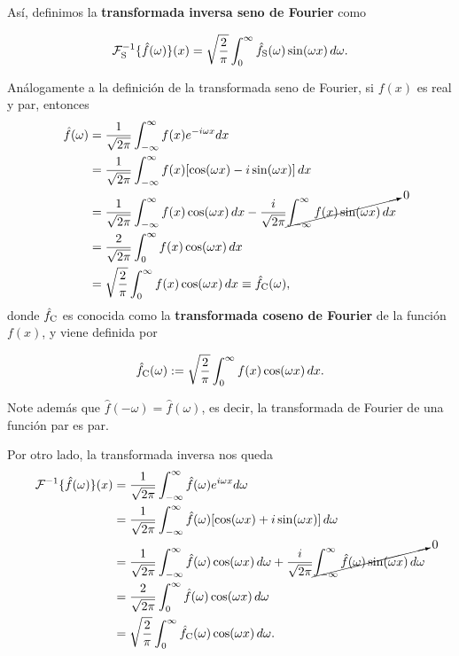 Así, definimos la \textbf{transformada inversa seno de Fourier} como
\begin{shaded}
    \begin{equation}
         \mathcal{F}^{-1}_{\rm S}\{\hat{f}(\omega)\}(x) = \sqrt{\frac{2}{\pi}} \int_{0}^{\infty} \hat{f}_{\rm S}(\omega) \sin(\omega x) \,d\omega. 
    \end{equation}
\end{shaded}

Análogamente a la definición de la  transformada seno de Fourier, si $f(x)$ es real y par, entonces 
\begin{align}
    \hat{f}(\omega) &= \frac{1}{\sqrt{2\pi}} \int_{-\infty}^{\infty} f(x) e^{-i\omega x} dx \nonumber \\
&= \frac{1}{\sqrt{2\pi}} \int_{-\infty}^{\infty} f(x) [\cos(\omega x) - i \sin(\omega x)] \,dx \nonumber \\
 &= \frac{1}{\sqrt{2\pi}} \int_{-\infty}^{\infty} f(x) \cos(\omega x) \,dx  - \frac{i}{\sqrt{2\pi}} \cancelto{0}{\int_{-\infty}^{\infty} f(x) \sin(\omega x) \, dx} \nonumber \\
     &=  \frac{2}{\sqrt{2\pi}} \int_{0}^{\infty} f(x) \cos(\omega x) \, dx \nonumber \\
     &= \sqrt{\frac{2}{\pi}} \int_{0}^{\infty} f(x) \cos(\omega x) \,dx \equiv  \hat{f}_{\rm C}(\omega), 
\end{align}
donde $\hat{f}_{\rm C}$ es conocida como la \textbf{transformada coseno de Fourier} de la función $f(x)$, y viene definida por \cite{Mauch} 
\begin{shaded}
    \begin{equation}
        \hat{f}_{\rm C}(\omega) := \sqrt{\frac{2}{\pi}} \int_{0}^{\infty} f(x) \cos(\omega x) \,dx. \label{eq:Fourier-Cos}
    \end{equation}
\end{shaded}

Note además que $\hat{f}(-\omega) = \hat{f}(\omega)$, es decir, la transformada de Fourier de una función par es par. 

Por otro lado, la transformada inversa nos queda
\begin{align}
    \mathcal{F}^{-1}\{\hat{f}(\omega)\}(x)  &= \frac{1}{\sqrt{2\pi}} \int_{-\infty}^{\infty} \hat{f}(\omega) e^{i\omega x} d\omega \nonumber \\
&= \frac{1}{\sqrt{2\pi}} \int_{-\infty}^{\infty} \hat{f}(\omega) [\cos(\omega x) + i \sin(\omega x)] \,d\omega \nonumber \\
 &= \frac{1}{\sqrt{2\pi}} \int_{-\infty}^{\infty} \hat{f}(\omega) \cos(\omega x) \,d\omega  + \frac{i}{\sqrt{2\pi}} \cancelto{0}{\int_{-\infty}^{\infty} \hat{f}(\omega) \sin(\omega x) \, d\omega} \nonumber \\
     &= \frac{2}{\sqrt{2\pi}} \int_{0}^{\infty} \hat{f}(\omega) \cos(\omega x) \, d\omega \nonumber \\
     &= \sqrt{\frac{2}{\pi}} \int_{0}^{\infty} \hat{f}_{\rm C}(\omega) \cos(\omega x) \,d\omega. 
\end{align}

